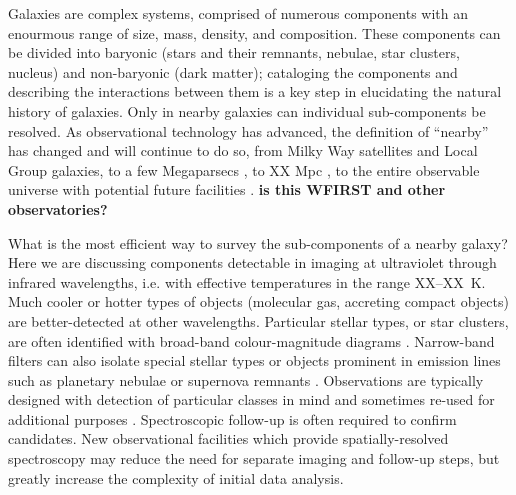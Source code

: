 

Galaxies are complex systems, comprised of numerous components with an enourmous range of size,
mass, density, and composition.
These components can be divided into baryonic (stars and their remnants,
nebulae, star clusters, nucleus) and non-baryonic (dark matter);
cataloging the components and describing
the interactions between them is a key step in elucidating the natural history of galaxies.
Only in nearby galaxies can individual sub-components be resolved.
As observational technology has advanced,
the definition of ``nearby'' has changed and will continue to do so, from Milky Way satellites and Local Group galaxies, to a few
Megaparsecs \citep[distance at which stars can be resolved with HST][]{},
to XX Mpc \citep[distance at which stars can be resolved with JWST][]{},
to the entire observable universe with potential future facilities \citep{}. \textbf{is this WFIRST and other observatories?}

What is the most efficient way to survey the sub-components of a nearby galaxy?
Here we are discussing components detectable in imaging at ultraviolet through infrared wavelengths,
i.e. with effective temperatures in the range XX--XX~K.
Much cooler or hotter types of objects (molecular gas, accreting compact objects) are better-detected at other wavelengths.
Particular stellar types, or star clusters, are often identified with broad-band colour-magnitude diagrams \citep[e.g.][]{}.
Narrow-band filters can also isolate special stellar types \citep[e.g.][]{} or objects prominent in emission
lines such as planetary nebulae or supernova remnants \citep[e.g.][]{}.
Observations are typically designed with detection of particular classes in mind and sometimes re-used for additional purposes \citep[e.g.][]{}.
Spectroscopic follow-up is often required to confirm candidates.
New observational facilities which provide spatially-resolved spectroscopy  \citep[e.g.]{}{} may reduce the need for separate imaging and follow-up steps,
but greatly increase the complexity of initial data analysis.


